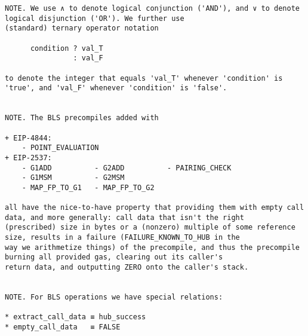 \documentclass[varwidth=\maxdimen,margin=0.5cm,multi={verbatim}]{standalone}
\begin{document}
\begin{verbatim}
NOTE. We use ∧ to denote logical conjunction ('AND'), and ∨ to denote logical disjunction ('OR'). We further use
(standard) ternary operator notation

      condition ? val_T
                : val_F

to denote the integer that equals 'val_T' whenever 'condition' is 'true', and 'val_F' whenever 'condition' is 'false'.


NOTE. The BLS precompiles added with

+ EIP-4844:
    - POINT_EVALUATION
+ EIP-2537:
    - G1ADD          - G2ADD          - PAIRING_CHECK
    - G1MSM          - G2MSM
    - MAP_FP_TO_G1   - MAP_FP_TO_G2

all have the nice-to-have property that providing them with empty call data, and more generally: call data that isn't the right
(prescribed) size in bytes or a (nonzero) multiple of some reference size, results in a failure (FAILURE_KNOWN_TO_HUB in the
way we arithmetize things) of the precompile, and thus the precompile burning all provided gas, clearing out its caller's
return data, and outputting ZERO onto the caller's stack.


NOTE. For BLS operations we have special relations:

* extract_call_data ≡ hub_success
* empty_call_data   ≡ FALSE

\end{verbatim}
\end{document}
